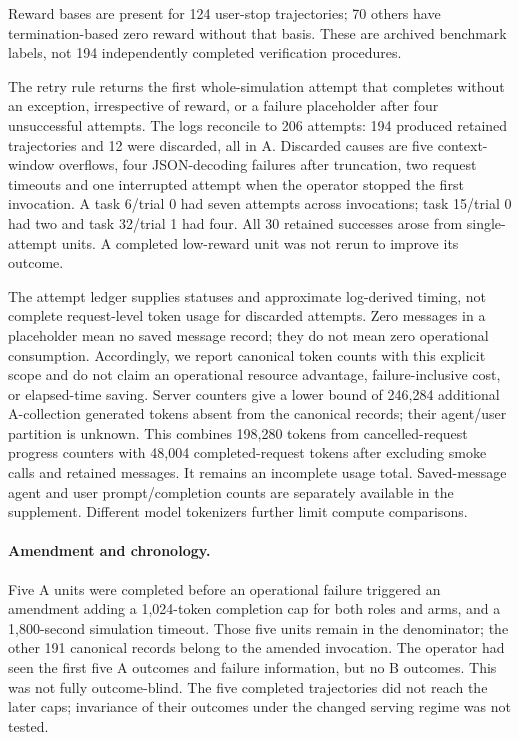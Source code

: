 Reward bases are present for 124 user-stop trajectories; 70 others have
termination-based zero reward without that basis. These are archived
benchmark labels, not 194 independently completed verification procedures.

The retry rule returns the first whole-simulation attempt that completes
without an exception, irrespective of reward, or a failure placeholder
after four unsuccessful attempts. The logs reconcile to 206 attempts:
194 produced retained trajectories and 12 were discarded, all in A.
Discarded causes are five context-window overflows, four JSON-decoding
failures after truncation, two request timeouts and one interrupted
attempt when the operator stopped the first invocation. A task 6/trial 0
had seven attempts across invocations; task 15/trial 0 had two and
task 32/trial 1 had four. All 30 retained successes arose from
single-attempt units. A completed low-reward unit was not rerun to
improve its outcome.

\begin{table}[h]
\centering\small
\caption{Canonical and attempt accounting. Token totals cover saved
messages only. Complete failed-attempt token usage is unavailable, so these are
not failure-inclusive compute or monetary costs.}
\label{tab:open_airline_accounting}

\end{table}

The attempt ledger supplies statuses and approximate log-derived timing,
not complete request-level token usage for discarded attempts. Zero
messages in a placeholder mean no saved message record; they do not mean
zero operational consumption. Accordingly, we report canonical token
counts with this explicit scope and do not claim an operational resource
advantage, failure-inclusive cost, or elapsed-time saving. Server counters
give a lower bound of 246,284 additional A-collection generated tokens
absent from the canonical records; their agent/user partition is unknown.
This combines 198,280 tokens from cancelled-request progress counters
with 48,004 completed-request tokens after excluding smoke calls and
retained messages. It remains an incomplete usage total. Saved-message
agent and user prompt/completion counts are separately available in the
supplement. Different model tokenizers further limit compute comparisons.

\paragraph{Amendment and chronology.}
Five A units were completed before an operational failure triggered an
amendment adding a 1,024-token completion cap for both roles and arms,
and a 1,800-second simulation timeout. Those five units remain in the
denominator; the other 191 canonical records belong to the amended
invocation. The operator had seen the first five A outcomes and failure
information, but no B outcomes. This was not fully outcome-blind.
The five completed trajectories did not reach the later caps; invariance
of their outcomes under the changed serving regime was not tested.

